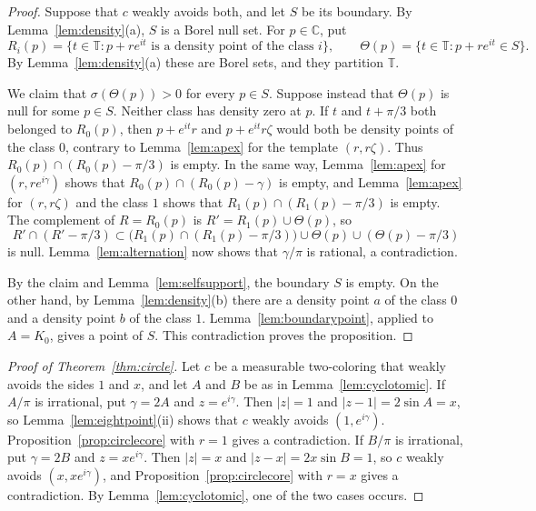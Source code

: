 \documentclass[10pt]{article}
\theoremstyle{remark}
\newcommand{\C}{\mathbb C}
\newcommand{\T}{\mathbb T}
\begin{document}
\begin{proof}
Suppose that $c$ weakly avoids both, and let $S$ be its boundary. By Lemma~\ref{lem:density}(a), $S$ is a Borel null set. For $p\in\C$, put
\[
 R_i(p)=\{t\in\T:p+re^{it}\text{ is a density point of the class }i\},\qquad
 \Theta(p)=\{t\in\T:p+re^{it}\in S\}.
\]
By Lemma~\ref{lem:density}(a) these are Borel sets, and they partition $\T$.

We claim that $\sigma(\Theta(p))>0$ for every $p\in S$. Suppose instead that $\Theta(p)$ is null for some $p\in S$. Neither class has density zero at $p$. If $t$ and $t+\pi/3$ both belonged to $R_0(p)$, then $p+e^{it}r$ and $p+e^{it}r\zeta$ would both be density points of the class $0$, contrary to Lemma~\ref{lem:apex} for the template $(r,r\zeta)$. Thus $R_0(p)\cap(R_0(p)-\pi/3)$ is empty. In the same way, Lemma~\ref{lem:apex} for $(r,re^{i\gamma})$ shows that $R_0(p)\cap(R_0(p)-\gamma)$ is empty, and Lemma~\ref{lem:apex} for $(r,r\zeta)$ and the class $1$ shows that $R_1(p)\cap(R_1(p)-\pi/3)$ is empty. The complement of $R=R_0(p)$ is $R'=R_1(p)\cup\Theta(p)$, so
\[
 R'\cap(R'-\pi/3)\subset\bigl(R_1(p)\cap(R_1(p)-\pi/3)\bigr)\cup\Theta(p)\cup(\Theta(p)-\pi/3)
\]
is null. Lemma~\ref{lem:alternation} now shows that $\gamma/\pi$ is rational, a contradiction.

By the claim and Lemma~\ref{lem:selfsupport}, the boundary $S$ is empty. On the other hand, by Lemma~\ref{lem:density}(b) there are a density point $a$ of the class $0$ and a density point $b$ of the class $1$. Lemma~\ref{lem:boundarypoint}, applied to $A=K_0$, gives a point of $S$. This contradiction proves the proposition.
\end{proof}

\begin{proof}[Proof of Theorem~\ref{thm:circle}]
Let $c$ be a measurable two-coloring that weakly avoids the sides $1$ and $x$, and let $A$ and $B$ be as in Lemma~\ref{lem:cyclotomic}. If $A/\pi$ is irrational, put $\gamma=2A$ and $z=e^{i\gamma}$. Then $|z|=1$ and $|z-1|=2\sin A=x$, so Lemma~\ref{lem:eightpoint}(ii) shows that $c$ weakly avoids $(1,e^{i\gamma})$. Proposition~\ref{prop:circlecore} with $r=1$ gives a contradiction. If $B/\pi$ is irrational, put $\gamma=2B$ and $z=xe^{i\gamma}$. Then $|z|=x$ and $|z-x|=2x\sin B=1$, so $c$ weakly avoids $(x,xe^{i\gamma})$, and Proposition~\ref{prop:circlecore} with $r=x$ gives a contradiction. By Lemma~\ref{lem:cyclotomic}, one of the two cases occurs.
\end{proof}
\end{document}

